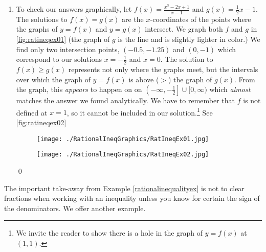 \begin{ex}
\begin{enumerate}
\item  To check our answers graphically,  let $f(x) = \frac{x^3-2x+1}{x-1}$ and $g(x) = \frac{1}{2} x -1$. The solutions to $f(x)=g(x)$ are the $x$-coordinates of the points where the graphs of $y=f(x)$ and $y=g(x)$ intersect.  We graph both $f$ and $g$ in \autoref{fig:ratineqex01} (the graph of $g$ is the line and is slightly lighter in color.) We find only two intersection points, $(-0.5, -1.25)$ and $(0,-1)$ which correspond to our solutions $x = -\frac{1}{2}$ and $x = 0$.   The solution to $f(x) \geq g(x)$ represents not only where the graphs meet, but the intervals over which the graph of $y=f(x)$ is above ($>$) the graph of $g(x)$.  From the graph, this \textit{appears} to happen on on $\left( - \infty, -\frac{1}{2} \right] \cup [0, \infty)$ which \textit{almost} matches the answer we found analytically.  We have to remember that $f$ is not defined at $x=1$,  so it cannot be included in our solution.\footnote{We invite the reader to show there is a hole in the graph of $y = f(x)$ at $(1,1)$.} See \autoref{fig:ratineqex02}

\begin{figure}
\begin{center}

\texttt{[image: ./RationalIneqGraphics/RatIneqEx01.jpg]} 

\caption{}
\label{fig:ratineqex01}
\end{center}
\end{figure}

\begin{figure}
\begin{center}
    
\texttt{[image: ./RationalIneqGraphics/RatIneqEx02.jpg]}

\caption{}
\label{fig:ratineqex02}
\end{center}
\end{figure}

\qed

\end{enumerate}
\end{ex}

The important take-away from Example \ref{rationalinequalityex} is not to clear fractions when working with an inequality unless you know for certain the sign of the denominators. We offer another example.

